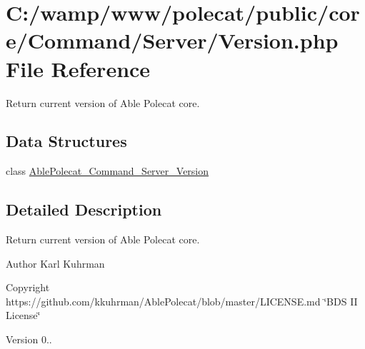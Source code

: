 \hypertarget{_command_2_server_2_version_8php}{}\section{C\+:/wamp/www/polecat/public/core/\+Command/\+Server/\+Version.php File Reference}
\label{_command_2_server_2_version_8php}


Return current version of Able Polecat core.  


\subsection*{Data Structures}
\begin{DoxyCompactItemize}
\item 
class \hyperlink{class_able_polecat___command___server___version}{Able\+Polecat\+\_\+\+Command\+\_\+\+Server\+\_\+\+Version}
\end{DoxyCompactItemize}


\subsection{Detailed Description}
Return current version of Able Polecat core. 

\begin{DoxyAuthor}{Author}
Karl Kuhrman 
\end{DoxyAuthor}
\begin{DoxyCopyright}{Copyright}
https\+://github.com/kkuhrman/\+Able\+Polecat/blob/master/\+L\+I\+C\+E\+N\+S\+E.\+md \char`\"{}\+B\+D\+S I\+I License\char`\"{} 
\end{DoxyCopyright}
\begin{DoxyVersion}{Version}
0.. 
\end{DoxyVersion}
